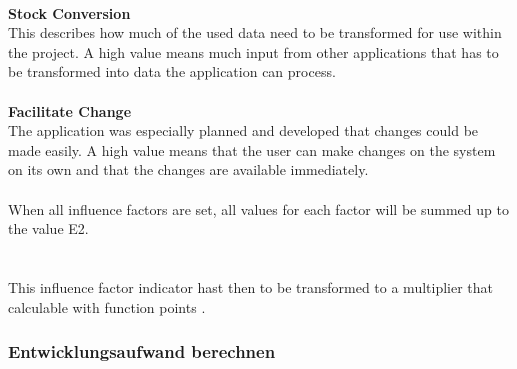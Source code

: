 \\
\textbf{Stock Conversion}\\
This describes how much of the used data need to be transformed for use within the project. A high value means much input from other applications that has to be transformed into data the application can process.\\
\\
\textbf{Facilitate Change}\\
The application was especially planned and developed that changes could be made easily. A high value means that the user can make changes on the system on its own and that the changes are available immediately.
\\
\\
When all influence factors are set, all values for each factor will be summed up to the value E2.\\ 

\\
\\
This influence factor indicator hast then to be transformed to a multiplier that calculable with function points \cite{Softwaremanagement}\cite{fpafundamentals}.  \\

\subsubsection{Entwicklungsaufwand berechnen}

